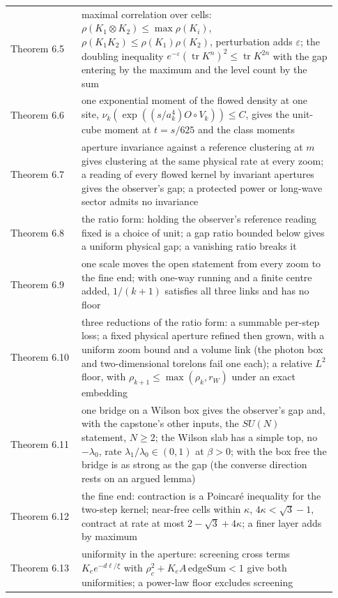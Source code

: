 \documentclass[10pt,letterpaper,twocolumn]{article}
\begin{document}
\begin{center}
{\begin{xtabular}{L{0.207\linewidth}L{0.724\linewidth}}
Theorem 6.5 & maximal correlation over cells:
\(\rho(K_1\otimes K_2)\le\max\rho(K_i)\),
\(\rho(K_1K_2)\le\rho(K_1)\rho(K_2)\), perturbation adds
\(\varepsilon\); the doubling inequality
\(e^{-\varepsilon}(\operatorname{tr}K^n)^2\le\operatorname{tr}K^{2n}\)
with the gap entering by the maximum and the level count by the sum \\
Theorem 6.6 & one exponential moment of the flowed density at one site,
\(\nu_k(\exp((s/a_k^4)O\circ V_k))\le C\), gives the unit-cube moment at
\(t=s/625\) and the class moments \\
Theorem 6.7 & aperture invariance against a reference clustering at \(m\) gives
clustering at the same physical rate at every zoom; a reading of every
flowed kernel by invariant apertures gives the observer's gap; a
protected power or long-wave sector admits no invariance \\
Theorem 6.8 & the ratio form: holding the observer's reference reading fixed is a
choice of unit; a gap ratio bounded below gives a uniform physical gap;
a vanishing ratio breaks it \\
Theorem 6.9 & one scale moves the open statement from every zoom to the fine end; with
one-way running and a finite centre added, \(1/(k+1)\) satisfies all
three links and has no floor \\
Theorem 6.10 & three reductions of the ratio form: a summable per-step loss; a fixed
physical aperture refined then grown, with a uniform zoom bound and a
volume link (the photon box and two-dimensional torelons fail one each);
a relative \(L^2\) floor, with \(\rho_{k+1}\le\max(\rho_k,r_W)\) under
an exact embedding \\
Theorem 6.11 & one bridge on a Wilson box gives the observer's gap and, with the
capstone's other inputs, the \(SU(N)\) statement, \(N\ge2\); the Wilson
slab has a simple top, no \(-\lambda_0\), rate
\(\lambda_1/\lambda_0\in(0,1)\) at \(\beta>0\); with the box free the
bridge is as strong as the gap (the converse direction rests on an
argued lemma) \\
Theorem 6.12 & the fine end: contraction is a Poincaré inequality for the two-step
kernel; near-free cells within \(\kappa\), \(4\kappa<\sqrt3-1\),
contract at rate at most \(2-\sqrt3+4\kappa\); a finer layer adds by
maximum \\
Theorem 6.13 & uniformity in the aperture: screening cross terms \(K_ee^{-d\ell/\xi}\)
with \(\rho_c^2+K_eA\,\mathrm{edgeSum}<1\) give both uniformities; a
power-law floor excludes screening \\

\end{xtabular}}
\end{center}
\end{document}
